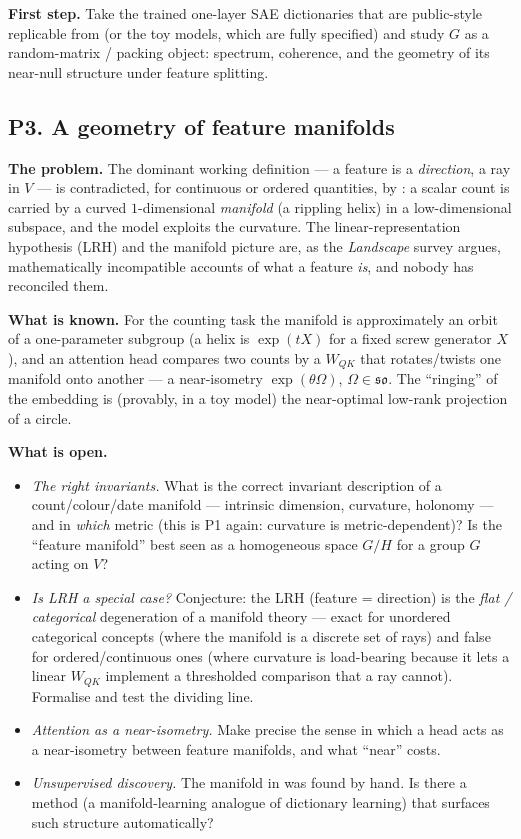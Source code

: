 \textbf{First step.} Take the trained one-layer SAE dictionaries that are public-style replicable
from \textcite{towards-monosemanticity} (or the toy models, which are fully specified) and study
$G$ as a random-matrix / packing object: spectrum, coherence, and the geometry of its near-null
structure under feature splitting.

\subsection*{P3. A geometry of feature manifolds}

\textbf{The problem.} The dominant working definition --- a feature is a \emph{direction}, a ray in
$V$ --- is contradicted, for continuous or ordered quantities, by
\textcite{when-models-manipulate-manifolds-counting}: a scalar count is carried by a curved
$1$-dimensional \emph{manifold} (a rippling helix) in a low-dimensional subspace, and the model
exploits the curvature. The linear-representation hypothesis (LRH) and the manifold picture are,
as the \emph{Landscape} survey argues, mathematically incompatible accounts of what a feature
\emph{is}, and nobody has reconciled them.

\textbf{What is known.} For the counting task the manifold is approximately an orbit of a
one-parameter subgroup (a helix is $\exp(tX)$ for a fixed screw generator $X$), and an attention
head compares two counts by a $W_{QK}$ that rotates/twists one manifold onto another --- a
near-isometry $\exp(\theta\Omega)$, $\Omega\in\mathfrak{so}$. The ``ringing'' of the embedding is
(provably, in a toy model) the near-optimal low-rank projection of a circle.

\textbf{What is open.}
\begin{itemize}
\item \emph{The right invariants.} What is the correct invariant description of a count/colour/date
  manifold --- intrinsic dimension, curvature, holonomy --- and in \emph{which} metric (this is
  P1 again: curvature is metric-dependent)? Is the ``feature manifold'' best seen as a homogeneous
  space $G/H$ for a group $G$ acting on $V$?
\item \emph{Is LRH a special case?} Conjecture: the LRH (feature = direction) is the
  \emph{flat / categorical} degeneration of a manifold theory --- exact for unordered categorical
  concepts (where the manifold is a discrete set of rays) and false for ordered/continuous ones
  (where curvature is load-bearing because it lets a linear $W_{QK}$ implement a thresholded
  comparison that a ray cannot). Formalise and test the dividing line.
\item \emph{Attention as a near-isometry.} Make precise the sense in which a head acts as a
  near-isometry between feature manifolds, and what ``near'' costs.
\item \emph{Unsupervised discovery.} The manifold in \textcite{when-models-manipulate-manifolds-counting}
  was found by hand. Is there a method (a manifold-learning analogue of dictionary learning) that
  surfaces such structure automatically?
\end{itemize}

